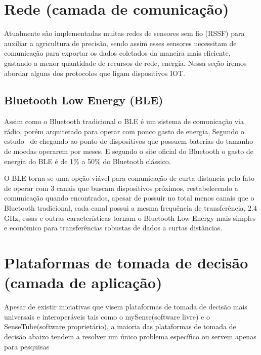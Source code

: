 \documentclass[
article,			%
12pt,				%
oneside,			%
a4paper,			%
english,			%
brazil,				%
sumario=tradicional
]{abntex2}
\begin{document}
\section{Rede (camada de comunicação)}\label{Rede (camada de comunicação)}

Atualmente são implementadas muitas redes de sensores sem fio (RSSF) para auxiliar a agricultura de precisão\cite{6}, sendo assim esses sensores necessitam de comunicação para exportar os dados coletados da maneira mais eficiente, gastando a menor quantidade de recursos de rede, energia\cite{5}. Nessa seção iremos abordar alguns dos protocolos que ligam dispositivos IOT.

\subsection{Bluetooth Low Energy (BLE)}\label{Bluetooth Low Energy (BLE)}
Assim como o Bluetooth tradicional o BLE é um sistema de comunicação via rádio, porém arquitetado para operar com pouco gasto de energia\cite{siteBluetooth}, Segundo o estudo~\citeauthor{ble} de chegando ao ponto de dispositivos que possuem baterias do tamanho de moedas operarem por meses. E segundo o site oficial do Bluetooth\cite{siteBluetooth} o gasto de energia do BLE é de 1\% a 50\% do Bluetooth clássico.

O BLE torna-se uma opção viável para comunicação de curta distancia pelo fato de operar com 3 canais\cite{ble} que buscam dispositivos próximos, restabelecendo a comunicação quando encontrados, apesar de possuir no total menos canais que o Bluetooth tradicional, cada canal possui a mesma frequência de transferência, 2.4 GHz, essas e outras características tornam o Bluetooth Low Energy mais simples e econômico para transferências robustas de dados a curtas distâncias\cite{ble}.

\section{Plataformas de tomada de decisão (camada de aplicação)}\label{Plataformas de tomada de decisão}

Apesar de existir iniciativas que visem plataformas de tomada de decisão mais universais e interoperáveis tais como o mySense\cite{7}(software livre) e o SenseTube\cite{6}(software proprietário), a maioria das plataformas de tomada de decisão abaixo tendem a resolver um único problema específico ou servem apenas para pesquisas

\end{document}
